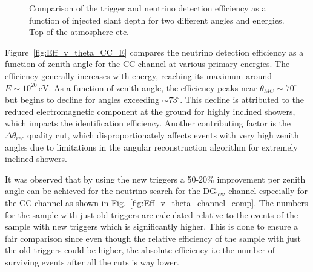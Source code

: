 \begin{figure}[h!]
  \centering
  \hfill
  \caption{Comparison of the trigger and neutrino detection efficiency as a function of injected slant depth for two different angles and energies. Top of the atmosphere etc.} 
  \label{fig:Eff_X_comp}
\end{figure}

Figure~\ref{fig:Eff_v_theta_CC_E} compares the neutrino detection efficiency as a function of zenith angle for the CC channel at various primary energies. The efficiency generally increases with energy, reaching its maximum around \(E \sim 10^{20}\,\mathrm{eV}\). As a function of zenith angle, the efficiency peaks near \(\theta_{MC} \sim 70^\circ\) but begins to decline for angles exceeding \(\sim 73^\circ\). This decline is attributed to the reduced electromagnetic component at the ground for highly inclined showers, which impacts the identification efficiency. Another contributing factor is the \(\Delta \theta_{rec}\) quality cut, which disproportionately affects events with very high zenith angles due to limitations in the angular reconstruction algorithm for extremely inclined showers.

It was observed that by using the new triggers a 50-20\% improvement per zenith angle can be achieved for the neutrino search for the DG$\mathrm{_{low}}$ channel especially for the CC channel as shown in Fig.~\ref{fig:Eff_v_theta_channel_comp}. The numbers for the sample with just old triggers are calculated relative to the events of the sample with new triggers which is significantly higher. This is done to ensure a fair comparison since even though the relative efficiency of the sample with just the old triggers could be higher, the absolute efficiency i.e the number of surviving events after all the cuts is way lower. 

